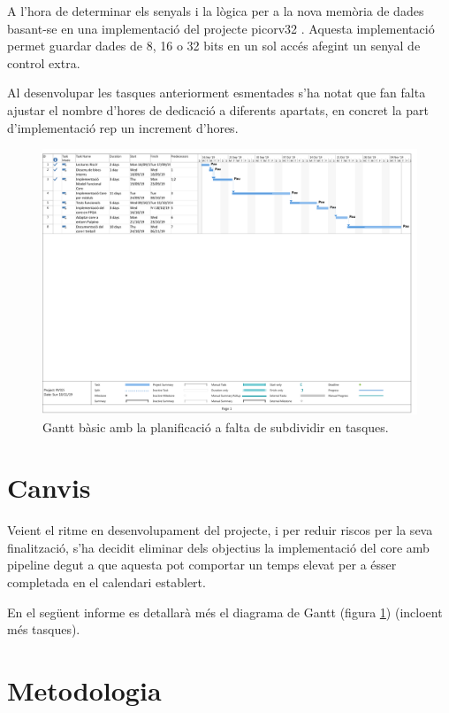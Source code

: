 \documentclass[conference,onecolumn, catalan]{IEEEtran}
\begin{document}
A l'hora de determinar els senyals i la lògica per a la nova memòria de dades basant-se en una implementació del projecte picorv32 \cite{wolf_cliffordwolf/picorv32_2019}. Aquesta implementació permet guardar dades de 8, 16 o 32 bits en un sol accés afegint un senyal de control extra.

Al desenvolupar les tasques anteriorment esmentades s'ha notat que fan falta ajustar el nombre d'hores de dedicació a diferents apartats, en concret la part d'implementació rep un increment d'hores.

\begin{figure}[!ht]
\centering
\includegraphics[width=\textwidth]{gantt.pdf}
\caption{Gantt bàsic amb la planificació a falta de subdividir en tasques.}
\label{fig:gantt}
\end{figure}

\section{Canvis}

Veient el ritme en desenvolupament del projecte, i per reduir riscos per la seva finalització, s'ha decidit eliminar dels objectius la implementació del core amb pipeline degut a que aquesta pot comportar un temps elevat per a ésser completada en el calendari establert.

En el següent informe es detallarà més el diagrama de Gantt (figura \ref{fig:gantt}) (incloent més tasques).




\section{Metodologia}
\end{document}
